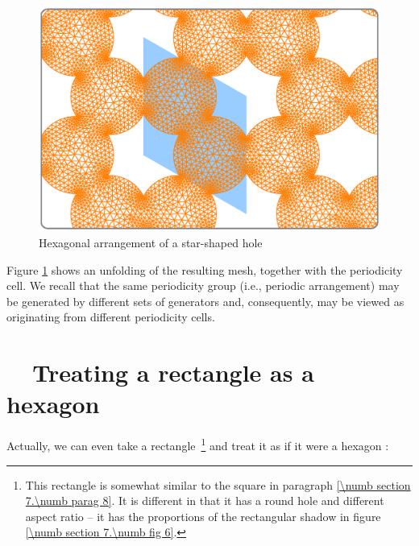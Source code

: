 \begin{figure}[ht] \centering
  \includegraphics[width=135mm]{repeated-balls.eps}
  \caption{Hexagonal arrangement of a star-shaped hole}
  \label{\numb section 7.\numb fig 17}
\end{figure}

Figure \ref{\numb section 7.\numb fig 17} shows an unfolding of the resulting mesh,
together with the periodicity cell.
We recall that the same periodicity group (i.e., periodic arrangement) may be generated
by different sets of generators and, consequently, may be viewed as originating
from different periodicity cells.


\section{~~Treating a rectangle as a hexagon}\label{\numb section 7.\numb parag 22}

Actually, we can even take a rectangle$\,$%
\footnote {{} This rectangle is somewhat similar to the square in paragraph
\ref{\numb section 7.\numb parag 8}.
It is different in that it has a round hole and different aspect ratio --
it has the proportions of the rectangular shadow in figure \ref{\numb section 7.\numb fig 6}.}
and treat it as if it were a hexagon :
\vskip 3mm

